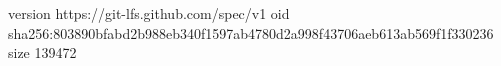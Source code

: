 version https://git-lfs.github.com/spec/v1
oid sha256:803890bfabd2b988eb340f1597ab4780d2a998f43706aeb613ab569f1f330236
size 139472
